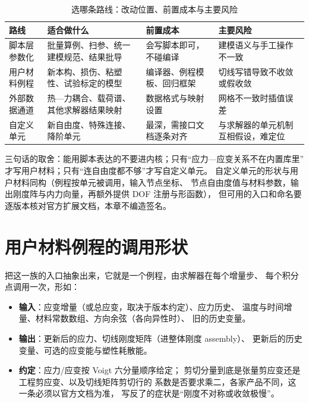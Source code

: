 \documentclass[12pt,a4paper,fontset=fandol]{ctexbook}
\begin{document}
\begin{table}[htbp]
\centering
\caption{选哪条路线：改动位置、前置成本与主要风险}
\label{tab:ch04-route-choice}
\begin{tabular}{>{\raggedright\arraybackslash}p{} >{\raggedright\arraybackslash}p{} >{\raggedright\arraybackslash}p{} >{\raggedright\arraybackslash}p{}}
\toprule
路线 & 适合做什么 & 前置成本 & 主要风险 \\
\midrule
脚本层参数化 & 批量算例、扫参、统一建模规范、结果批导 & 会写脚本即可，不碰编译 &
建模语义与手工操作不一致 \\
用户材料例程 & 新本构、损伤、粘塑性、试验标定的模型 & 编译器、例程模板、回归框架 &
切线写错导致不收敛或假收敛 \\
外部数据通道 & 热—力耦合、载荷谱、其他求解器结果映射 & 数据格式与映射设置 &
网格不一致时插值误差 \\
自定义单元 & 新自由度、特殊连接、降阶单元 & 最深，需接口文档逐条对齐 &
与求解器的单元机制互相假设，难定位 \\
\bottomrule
\end{tabular}
\end{table}

三句话的取舍：能用脚本表达的不要进内核；只有``应力—应变关系不在内置库里''
才写用户材料；只有``连自由度都不够''才写自定义单元。
自定义单元的形状与用户材料同构（例程按单元被调用，输入节点坐标、
节点自由度值与材料参数，输出刚度阵与内力向量，再额外提供 DOF 注册与形函数），
但可用的入口和命名要逐版本核对官方扩展文档，本章不编造签名。

\section{用户材料例程的调用形状}
\label{sec:ch04-umat-shape}

把这一族的入口抽象出来，它就是一个例程，由求解器在每个增量步、
每个积分点调用一次，形如：

\begin{itemize}
  \item \textbf{输入}：应变增量（或总应变，取决于版本约定）、应力历史、
        温度与时间增量、材料常数数组、方向余弦（各向异性时）、
        旧的历史变量。
  \item \textbf{输出}：更新后的应力、切线刚度矩阵（进整体刚度 assembly）、
        更新后的历史变量、可选的应变能与塑性耗散能。
  \item \textbf{约定}：应力/应变按 Voigt 六分量顺序给定；
        剪切分量到底是张量剪应变还是工程剪应变、以及切线矩阵剪切行的
        系数是否要求乘二，各家产品不同，这一条必须以官方文档为准，
        写反了的症状是``刚度不对称或收敛极慢''。
\end{itemize}
\end{document}
